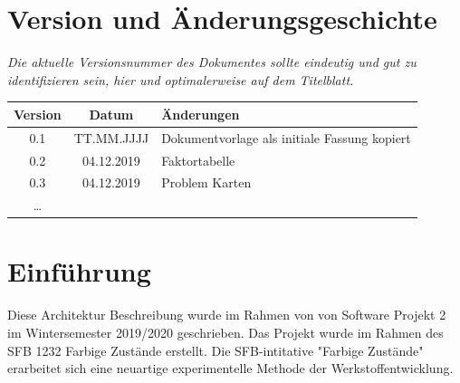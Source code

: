 \documentclass[enabledeprecatedfontcommands,fontsize=12pt,paper=a4,twoside]{scrartcl}
\begin{document}
\newpage

  \thispagestyle{fancy}
  \fancyhead{}
  \fancyfoot{}
  \renewcommand{\headrulewidth}{0.4pt}
  \tableofcontents

\newpage



\section*{Version und Änderungsgeschichte}

{\em Die aktuelle Versionsnummer des Dokumentes sollte eindeutig und gut zu
identifizieren sein, hier und optimalerweise auf dem Titelblatt.}

\begin{tabular}{ccl}
Version & Datum & Änderungen \\
\hline
0.1 & TT.MM.JJJJ & Dokumentvorlage als initiale Fassung kopiert \\
0.2 & 04.12.2019 & Faktortabelle \\
0.3 & 04.12.2019 & Problem Karten \\
\ldots
\end{tabular}


\section{Einführung}

Diese Architektur Beschreibung wurde im Rahmen von von Software Projekt 2 im Wintersemester 2019/2020 geschrieben. Das Projekt wurde im Rahmen des SFB 1232 Farbige Zustände erstellt. Die SFB-intitative "Farbige Zustände" erarbeitet sich eine neuartige experimentelle Methode der Werkstoffentwicklung.
\end{document}
